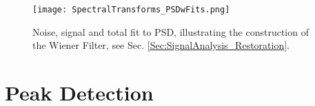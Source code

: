 \documentclass[../../CompleteThesis2/Complete_2ndDraft]{subfiles}
\begin{document}
\begin{figure}
	\centering
	\texttt{[image: SpectralTransforms\_PSDwFits.png]}
	\caption[FFT, DCT, NDCT PSDs with Fit, Site A]{Noise, signal and total fit to PSD, illustrating the construction of the Wiener Filter, see Sec. \ref{Sec:SignalAnalysis_Restoration}.}
	\label{fig:SpectralTransforms_PSDwFits}
\end{figure}









\section[Peak Detection]{Peak Detection}
\label{Sec:CompMeths_PeakDetection}
\end{document}
